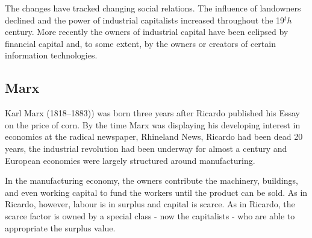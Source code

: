 The changes have tracked changing social relations. The influence of landowners declined and the power of  industrial capitalists increased throughout the 19$^th$ century. More recently the owners of industrial capital have been eclipsed  by financial capital and, to some extent, by the owners or creators of certain information technologies.

\subsection{Marx}


Karl Marx (1818--1883)) was born three years after Ricardo published his Essay on the price of corn. 
By the time Marx was displaying  his developing interest in economics  at the radical newspaper, Rhineland News, Ricardo had been dead 20 years, the industrial revolution had been underway for almost a century and European economies were largely structured around manufacturing. 

 In the manufacturing economy, the owners contribute the machinery, buildings, and even working capital to fund the workers until the product can be sold. %
As in Ricardo, however, labour is in surplus and capital is scarce. As in Ricardo, the scarce factor is owned by a special class - now the capitalists - who are able to appropriate the surplus value. %

